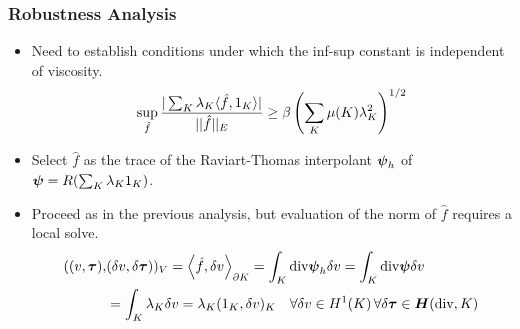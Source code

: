 \documentclass{beamer}
\begin{document}
\begin{frame}
\frametitle{Robustness Analysis}
\begin{itemize}
    \item Need to establish conditions under which the inf-sup constant is
      independent of viscosity.
      \begin{equation*}
        \sup_{\hat{f}} \frac{| \sum_K \lambda_K \langle \hat{f},1_K \rangle |}{|| \hat{f} ||_E}
        \geq  \beta \left( \sum_K \mu(K) \lambda_K^2 \right)^{1/2}
      \end{equation*}
    \item Select $\hat f$ as the trace of the Raviart-Thomas interpolant
      $\boldsymbol\psi_h$ of $\boldsymbol\psi=R(\sum_K\lambda_K1_K)$.
    \item Proceed as in the previous analysis, but evaluation of the norm of
      $\hat f$ requires a local solve.
      \begin{align*}
        ( (v,\boldsymbol\tau),&(\delta v,\delta\boldsymbol\tau) )_V
        =\left\langle \hat f,\delta v \right\rangle_{\partial K}
        =\int_K\text{div}\boldsymbol\psi_h\delta v
        =\int_K\text{div}\boldsymbol\psi\delta v\\
        &=\int_K\lambda_K\delta v=\lambda_K(1_K,\delta v)_K
        \quad\forall\delta v\in
        H^1(K)\,\forall\delta\boldsymbol\tau\in\mbox{\boldmath $H$}(\text{div},K)
      \end{align*}
\end{itemize}
\end{frame}

\end{document}
